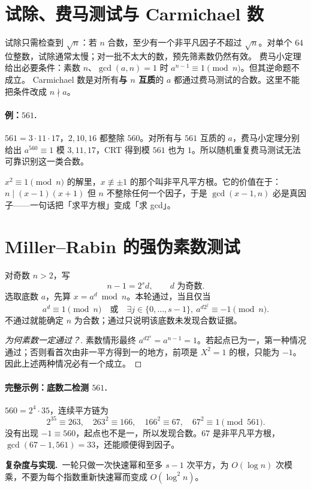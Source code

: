 \documentclass[UTF8,a4paper,11pt,twoside,openright,fontset=fandol]{ctexbook}
\theoremstyle{definition}
\newcommand{\cost}{\par\noindent\textbf{复杂度与实现.}\ }
\begin{document}
\section{试除、费马测试与 Carmichael 数}
试除只需检查到 $\sqrt n$：若 $n$ 合数，至少有一个非平凡因子不超过 $\sqrt n$。对单个 $64$ 位整数，试除通常太慢；对一批不太大的数，预先筛素数仍然有效。
费马小定理给出必要条件：素数 $n$、$\gcd(a,n)=1$ 时 $a^{n-1}\equiv1\pmod n$。但其逆命题不成立。
Carmichael 数是对所有\textbf{与 $n$ 互质}的 $a$ 都通过费马测试的合数。这里不能把条件改成 $n\nmid a$。


\paragraph{例：$561$.} $561=3\cdot11\cdot17$，$2,10,16$ 都整除 $560$。对所有与 $561$ 互质的 $a$，费马小定理分别给出 $a^{560}\equiv1$ 模 $3,11,17$，CRT 得到模 $561$ 也为 $1$。所以随机重复费马测试无法可靠识别这一类合数。
\begin{tip}[词义：非平凡平方根]
$x^2\equiv1\pmod n$ 的解里，$x\not\equiv\pm1$ 的那个叫非平凡平方根。它的价值在于：$n\mid(x-1)(x+1)$ 但 $n$ 不整除任何一个因子，于是 $\gcd(x-1,n)$ 必是真因子——一句话把「求平方根」变成「求 gcd」。
\end{tip}



\section{Miller--Rabin 的强伪素数测试}
对奇数 $n>2$，写
\[
 n-1=2^s d,\qquad d\text{ 为奇数}.
\]
选取底数 $a$，先算 $x=a^d\bmod n$。本轮通过，当且仅当
\[
 a^d\equiv1\pmod n
 \quad\text{或}\quad
 \exists j\in\{0,\ldots,s-1\},\ a^{d2^j}\equiv-1\pmod n.
\]
不通过就能确定 $n$ 为合数；通过只说明该底数未发现合数证据。


\begin{proof}[为何素数一定通过？]
素数情形最终 $a^{d2^s}=a^{n-1}=1$。若起点已为一，第一种情况通过；否则看首次由非一平方得到一的地方，前项是 $X^2=1$ 的根，只能为 $-1$。因此上述两种情况必有一个成立。
\end{proof}
\paragraph{完整示例：底数二检测 $561$.}
$560=2^4\cdot35$，连续平方链为
\[
 2^{35}\equiv263,\quad263^2\equiv166,\quad166^2\equiv67,\quad67^2\equiv1\pmod{561}.
\]
没有出现 $-1\equiv560$，起点也不是一，所以发现合数。$67$ 是非平凡平方根，$\gcd(67-1,561)=33$，还能顺便得到因子。
\cost 一轮只做一次快速幂和至多 $s-1$ 次平方，为 $O(\log n)$ 次模乘，不要为每个指数重新快速幂而变成 $O(\log^2n)$。
\end{document}
